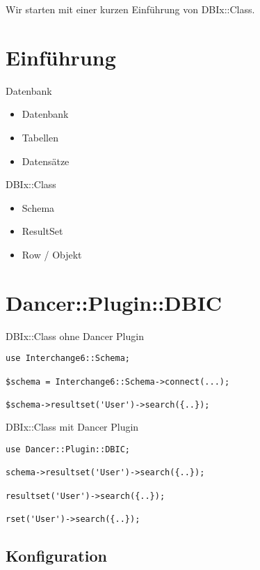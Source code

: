 Wir starten mit einer kurzen Einführung von DBIx::Class.

\section{Einführung}
\begin{frame}{Datenbank}
\begin{itemize}
\item Datenbank
\item Tabellen
\item Datensätze
\end{itemize}
\end{frame}

\begin{frame}{DBIx::Class}
\begin{itemize}
\item Schema
\item ResultSet
\item Row / Objekt
\end{itemize}
\end{frame}

\section{Dancer::Plugin::DBIC}
\begin{frame}[fragile]{DBIx::Class ohne Dancer Plugin}
\begin{lstlisting}
use Interchange6::Schema;

$schema = Interchange6::Schema->connect(...);

$schema->resultset('User')->search({..});
\end{lstlisting}
\end{frame}

\begin{frame}[fragile]{DBIx::Class mit Dancer Plugin}
\begin{lstlisting}
use Dancer::Plugin::DBIC;

schema->resultset('User')->search({..});

resultset('User')->search({..});

rset('User')->search({..});
\end{lstlisting}
\end{frame}

\subsection{Konfiguration}


